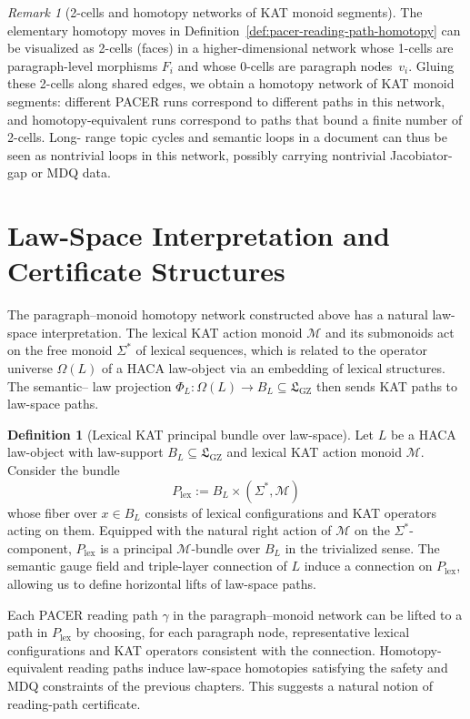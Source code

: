 \documentclass[11pt]{book}
\theoremstyle{plain}
\theoremstyle{definition}
\newtheorem{definition}[theorem]{Definition}
\theoremstyle{remark}
\newtheorem{remark}[theorem]{Remark}
\newcommand{\GZLS}{\ensuremath{\mathfrak{L}_{\mathrm{GZ}}}}       \newcommand{\GZLT}{\ensuremath{M_{!w}}}                           \newcommand{\GZLOC}{\ensuremath{A_M}}                             \newcommand{\GZLC}{\ensuremath{\omega_{\mathrm{law}}}}            \newcommand{\GZLCurv}{\ensuremath{\mathcal{F}_{\mathrm{law}}}}
\begin{document}
\begin{remark}[2-cells and homotopy networks of KAT monoid segments]
\label{rem:2-cells-homotopy-networks}
The elementary homotopy moves in
Definition~\ref{def:pacer-reading-path-homotopy} can be visualized as
2-cells (faces) in a higher-dimensional network whose 1-cells are
paragraph-level morphisms $F_i$ and whose 0-cells are paragraph
nodes~$v_i$. Gluing these 2-cells along shared edges, we obtain a
homotopy network of KAT monoid segments: different PACER runs
correspond to different paths in this network, and homotopy-equivalent
runs correspond to paths that bound a finite number of 2-cells. Long-
range topic cycles and semantic loops in a document can thus be seen
as nontrivial loops in this network, possibly carrying nontrivial
Jacobiator-gap or MDQ data.
\end{remark}

\section{Law-Space Interpretation and Certificate Structures}


The paragraph–monoid homotopy network constructed above has a natural
law-space interpretation. The lexical KAT action monoid $\mathcal{M}$
and its submonoids act on the free monoid $\Sigma^*$ of lexical
sequences, which is related to the operator universe $\Omega(L)$ of a
HACA law-object via an embedding of lexical structures. The semantic–
law projection $\Phi_L:\Omega(L)\to B_L\subseteq\GZLS$ then sends KAT
paths to law-space paths.

\begin{definition}[Lexical KAT principal bundle over law-space]
\label{def:lex-kat-principal-bundle}
Let $L$ be a HACA law-object with law-support $B_L\subseteq\GZLS$ and
lexical KAT action monoid $\mathcal{M}$. Consider the bundle
\[
  P_{\mathrm{lex}}
  :=
  B_L\times(\Sigma^*,\mathcal{M})
\]
whose fiber over $x\in B_L$ consists of lexical configurations and
KAT operators acting on them. Equipped with the natural right action
of $\mathcal{M}$ on the $\Sigma^*$-component, $P_{\mathrm{lex}}$ is a
principal $\mathcal{M}$-bundle over $B_L$ in the trivialized sense.
The semantic gauge field and triple-layer connection of $L$ induce a
connection on $P_{\mathrm{lex}}$, allowing us to define horizontal
lifts of law-space paths.
\end{definition}

Each PACER reading path $\gamma$ in the paragraph–monoid network can
be lifted to a path in $P_{\mathrm{lex}}$ by choosing, for each
paragraph node, representative lexical configurations and KAT operators
consistent with the connection. Homotopy-equivalent reading paths
induce law-space homotopies satisfying the safety and MDQ constraints
of the previous chapters. This suggests a natural notion of
reading-path certificate.
\end{document}
